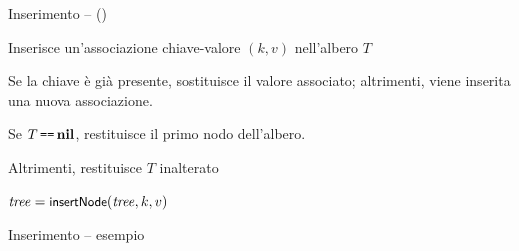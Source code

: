 \begin{frame}{Inserimento -- \insertnode() }

\begin{myboxtitle}
\BIL
\item Inserisce un'associazione chiave-valore $(k,v)$ nell'albero $T$
\item Se la chiave è già presente, sostituisce il valore associato; altrimenti, viene inserita una nuova associazione. 
\item Se $T \operatorname*{\texttt{==}} \textbf{nil}$, restituisce il primo nodo dell'albero. 
\item Altrimenti, restituisce $T$ inalterato
\EIL
\end{myboxtitle}

\begin{myboxtitle}
\vspace{-12pt}
\begin{Procedure}
\caption[A]{$\textsf{insert}(\Item\ k, \Item\ v)$}
$\mathit{tree} = \textsf{{\small insertNode}}(\mathit{tree}, k, v)$\;
\end{Procedure}
\vspace{-12pt}
\end{myboxtitle}

\end{frame}

\begin{frame}{Inserimento -- esempio}


\end{frame}


